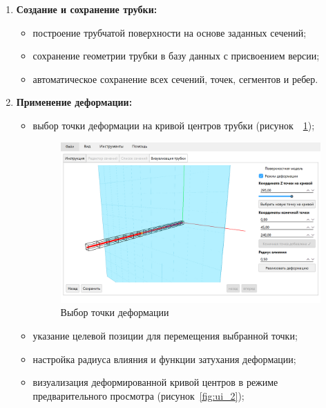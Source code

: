 \begin{enumerate}
    \item \textbf{Создание и сохранение трубки:}
    \begin{itemize}
        \item построение трубчатой поверхности на основе заданных сечений;
        \item сохранение геометрии трубки в базу данных с присвоением версии;
        \item автоматическое сохранение всех сечений, точек, сегментов и ребер.
    \end{itemize}
    
    \item \textbf{Применение деформации:}
    \begin{itemize}
        \item выбор точки деформации на кривой центров трубки (рисунок~~\ref{fig:ui_1});
        
        
\begin{figure}[H]
\centering
\includegraphics[width=1.0\textwidth]{img/ui_1.png}
\caption{Выбор точки деформации}
\label{fig:ui_1}
\end{figure}


        \item указание целевой позиции для перемещения выбранной точки;
        \item настройка радиуса влияния и функции затухания деформации;
        \item визуализация деформированной кривой центров в режиме предварительного просмотра (рисунок~\ref{fig:ui_2});
        

\end{itemize}
\end{enumerate}

